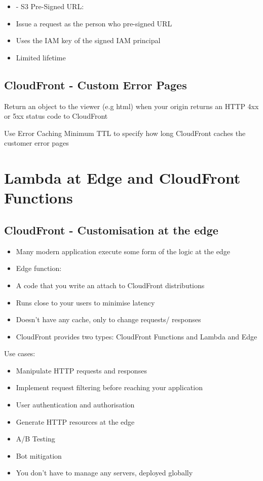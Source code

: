 \begin{itemize}
    \item - S3 Pre-Signed URL:
    \item Issue a request as the person who pre-signed URL
    \item Uses the IAM key of the signed IAM principal
    \item Limited lifetime
\end{itemize}


\subsection{CloudFront - Custom Error Pages}
\item Return an object to the viewer (e.g html) when your origin returns an HTTP 4xx or 5xx status code to CloudFront
\item Use Error Caching Minimum TTL to specify how long CloudFront caches the customer error pages



\section{Lambda at Edge and CloudFront Functions}

\subsection{CloudFront - Customisation at the edge}
\begin{itemize}
    \item Many modern application execute some form of the logic at the edge
    \item Edge function:
    \item A code that you write an attach to CloudFront distributions
    \item Runs close to your users to minimise latency
    \item Doesn't have any cache, only to change requests/ responses
    \item CloudFront provides two types: CloudFront Functions and Lambda and Edge
\end{itemize}
Use cases:
\begin{itemize}
    \item Manipulate HTTP requests and responses
    \item Implement request filtering before reaching your application
    \item User authentication and authorisation
    \item Generate HTTP resources at the edge
    \item A/B Testing
    \item Bot mitigation
    \item You don't have to manage any servers, deployed globally
\end{itemize}

